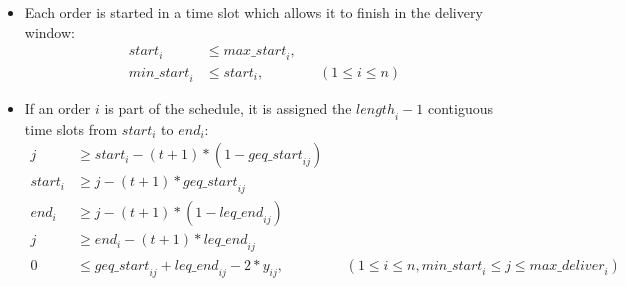 \documentclass{article}
\begin{document}
\begin{itemize}

    \item Each order is started in a time slot which allows it to finish in the delivery window:
    \begin{align}
    \mathit{start}_i &\leq \mathit{max\_start}_i, \\
    \mathit{min\_start}_i &\leq \mathit{start}_i, &&(1 \leq i \leq n)	
    \end{align}
    
    \item If an order $i$ is part of the schedule, it is assigned the $\mathit{length}_i - 1$ contiguous time slots from $\mathit{start}_i$ to $\mathit{end}_i$:
    \begin{align}
      j &\geq \mathit{start}_i - (t+1) * (1-\mathit{geq\_start}_{ij}) \\
      \mathit{start}_i &\geq j - (t+1) * \mathit{geq\_start}_{ij} \\
      \mathit{end}_i &\geq j - (t+1) * (1-\mathit{leq\_end}_{ij}) \\
      j &\geq \mathit{end}_i - (t+1) * \mathit{leq\_end}_{ij} \\
      0 &\leq \mathit{geq\_start}_{ij} + \mathit{leq\_end}_{ij} - 2 * y_{ij}, &&(1 \leq i \leq n, \mathit{min\_start}_i \leq j \leq \mathit{max\_deliver}_i) 
   \end{align}


\end{itemize}
\end{document}
